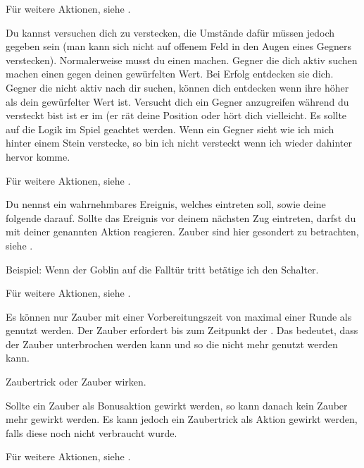 Für weitere Aktionen, siehe .



Du kannst versuchen dich zu verstecken, die Umstände dafür müssen jedoch gegeben sein (man kann sich nicht auf offenem Feld in den Augen eines Gegners verstecken). Normalerweise musst du einen  machen. Gegner die dich aktiv suchen machen einen  gegen deinen gewürfelten Wert. Bei Erfolg entdecken sie dich. Gegner die nicht aktiv nach dir suchen, können dich entdecken wenn ihre  höher als dein gewürfelter Wert ist. Versucht dich ein Gegner anzugreifen während du versteckt bist ist er im  (er rät deine Position oder hört dich vielleicht. Es sollte auf die Logik im Spiel geachtet werden. Wenn ein Gegner sieht wie ich mich hinter einem Stein verstecke, so bin ich nicht versteckt wenn ich wieder dahinter hervor komme.

Für weitere Aktionen, siehe .



Du nennst ein wahrnehmbares Ereignis, welches eintreten soll, sowie deine folgende  darauf. Sollte das Ereignis vor deinem nächsten Zug eintreten, darfst du mit deiner genannten Aktion reagieren. Zauber sind hier gesondert zu betrachten, siehe .

Beispiel: Wenn der Goblin auf die Falltür tritt betätige ich den Schalter.

Für weitere Aktionen, siehe .



Es können nur Zauber mit einer Vorbereitungszeit von maximal einer Runde als  genutzt werden. Der Zauber erfordert bis zum Zeitpunkt der  . Das bedeutet, dass der Zauber unterbrochen werden kann und so die  nicht mehr genutzt werden kann.



Zaubertrick oder Zauber wirken.

Sollte ein Zauber als Bonusaktion gewirkt werden, so kann danach kein Zauber mehr gewirkt werden. Es kann jedoch ein Zaubertrick als Aktion gewirkt werden, falls diese noch nicht verbraucht wurde.

Für weitere Aktionen, siehe .